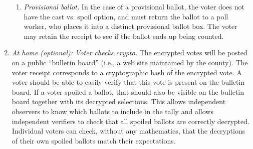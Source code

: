 \begin{enumerate}
\begin{enumerate}
\item {\em Provisional ballot.}
In the case of a provisional ballot, the voter does not have the cast vs. spoil option, and must return the ballot to a poll worker, who places it into a distinct provisional ballot box. The voter may retain the receipt to see if the ballot ends up being counted.
\end{enumerate}

\item {\em At home (optional): Voter checks crypto.}
The encrypted votes will be posted on a public ``bulletin board''
 (i.e., a web site maintained by the county).
 The voter receipt corresponds to a cryptographic hash of the encrypted vote.
 A voter should be able to easily verify that this vote is present on the bulletin board.
 If a voter spoiled a ballot, that should also be visible on the bulletin board
 together with its decrypted selections.  This allows independent observers to
 know which ballots to include in the tally and allows independent verifiers
 to check that all spoiled ballots are correctly decrypted.  Individual voters can
 check, without any mathematics,
 that the decryptions of their own spoiled ballots match their expectations.
\end{enumerate}



